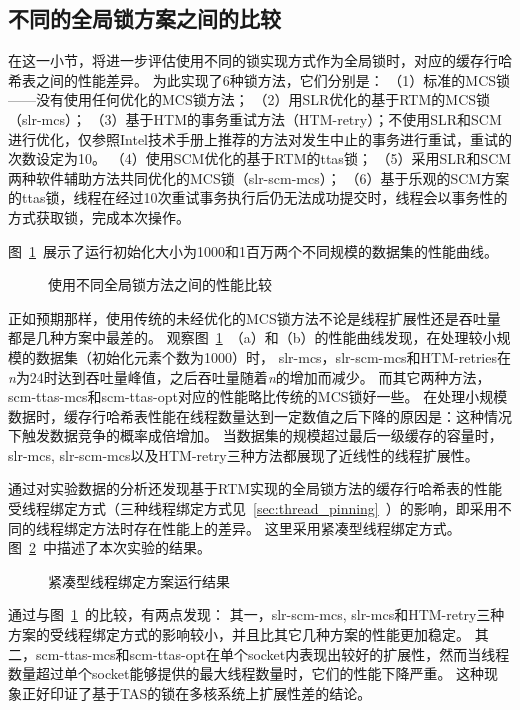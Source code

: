 \subsection{不同的全局锁方案之间的比较}
\label{sec:htm_global}
在这一小节，将进一步评估使用不同的锁实现方式作为全局锁时，对应的缓存行哈希表之间的性能差异。
为此实现了6种锁方法，它们分别是：
（1）标准的MCS锁——没有使用任何优化的MCS锁方法；
（2）用SLR优化的基于RTM的MCS锁（slr-mcs）；
（3）基于HTM的事务重试方法（HTM-retry）；不使用SLR和SCM进行优化，仅参照Intel技术手册上推荐的方法对发生中止的事务进行重试，重试的次数设定为10。
（4）使用SCM优化的基于RTM的ttas锁；
（5）采用SLR和SCM两种软件辅助方法共同优化的MCS锁（slr-scm-mcs）；
（6）基于乐观的SCM方案的ttas锁，线程在经过10次重试事务执行后仍无法成功提交时，线程会以事务性的方式获取锁，完成本次操作。

图~\ref{fig:htm_global}~展示了运行初始化大小为1000和1百万两个不同规模的数据集的性能曲线。
\begin{figure}[htbp]
\centering
\caption{使用不同全局锁方法之间的性能比较}
\label{fig:htm_global}
\end{figure}
正如预期那样，使用传统的未经优化的MCS锁方法不论是线程扩展性还是吞吐量都是几种方案中最差的。
观察图~\ref{fig:htm_global}~（a）和（b）的性能曲线发现，在处理较小规模的数据集（初始化元素个数为1000）时，
slr-mcs，slr-scm-mcs和HTM-retries在\textit{n}为24时达到吞吐量峰值，之后吞吐量随着\textit{n}的增加而减少。
而其它两种方法，scm-ttas-mcs和scm-ttas-opt对应的性能略比传统的MCS锁好一些。
在处理小规模数据时，缓存行哈希表性能在线程数量达到一定数值之后下降的原因是：这种情况下触发数据竞争的概率成倍增加。
当数据集的规模超过最后一级缓存的容量时，slr-mcs, slr-scm-mcs以及HTM-retry三种方法都展现了近线性的线程扩展性。

通过对实验数据的分析还发现基于RTM实现的全局锁方法的缓存行哈希表的性能受线程绑定方式（三种线程绑定方式见~\ref{sec:thread_pinning}~）的影响，即采用不同的线程绑定方法时存在性能上的差异。
这里采用紧凑型线程绑定方式。
图~\ref{fig:htm_pinning}~中描述了本次实验的结果。
\begin{figure}[htbp]
\centering
\caption{紧凑型线程绑定方案运行结果}
\label{fig:htm_pinning}
\end{figure}
通过与图~\ref{fig:htm_global}~的比较，有两点发现：
其一，slr-scm-mcs, slr-mcs和HTM-retry三种方案的受线程绑定方式的影响较小，并且比其它几种方案的性能更加稳定。
其二，scm-ttas-mcs和scm-ttas-opt在单个socket内表现出较好的扩展性，然而当线程数量超过单个socket能够提供的最大线程数量时，它们的性能下降严重。
这种现象正好印证了基于TAS的锁在多核系统上扩展性差的结论。

